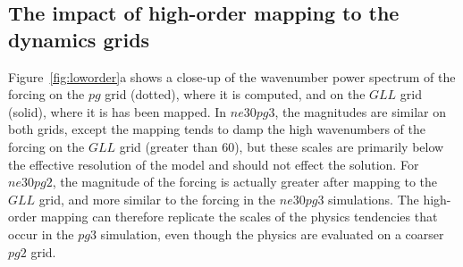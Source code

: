 \subsection{The impact of high-order mapping to the dynamics grids}\label{sec:app2}

Figure~\ref{fig:loworder}a shows a close-up of the wavenumber power spectrum of the forcing on the $pg$ grid (dotted), where it is computed, and on the $GLL$ grid (solid), where it is has been mapped. In $ne30pg3$, the magnitudes are similar on both grids, except the mapping tends to damp the high wavenumbers of the forcing on the $GLL$ grid (greater than 60), but these scales are primarily below the effective resolution of the model and should not effect the solution. For $ne30pg2$, the magnitude of the forcing is actually greater after mapping to the $GLL$ grid, and more similar to the forcing in the $ne30pg3$ simulations. The high-order mapping can therefore replicate the scales of the physics tendencies that occur in the $pg3$ simulation, even though the physics are evaluated on a coarser $pg2$ grid.

